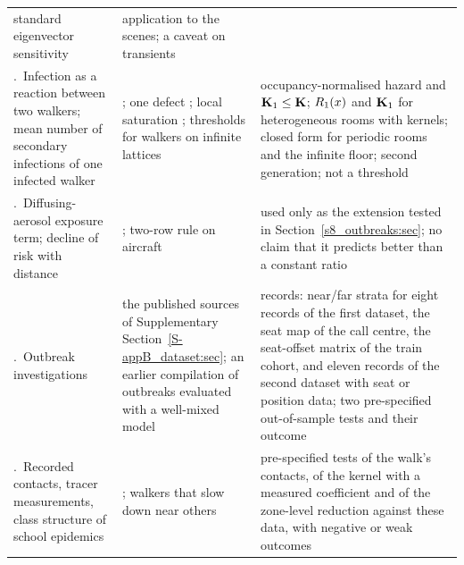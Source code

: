 \begin{table}[tbp]
\begin{tabular}{@{}>{\raggedright\arraybackslash}p{}>{\raggedright\arraybackslash}p{}>{\raggedright\arraybackslash}p{}@{}}
  standard eigenvector sensitivity &
  application to the scenes; a caveat on transients \\\addlinespace[2pt]
7.\ Infection as a reaction between two walkers; mean number of secondary infections of one infected
  walker &
  \citep{kenkre2014theory,sugaya2018analysis,giuggioli2022spatio,kenkre2021theory}; one defect
  \citep{szabo1984localized}; local saturation
  \citep{ball1997epidemics,keeling1999effects,durrett1994importance}; thresholds for walkers on
  infinite lattices \citep{kesten2006phase,maia2007diffusive,carvalho2025generalized} &
  occupancy-normalised hazard and $\mathbf{K}_1\le\mathbf{K}$; $R_1(x)$ and $\mathbf{K}_1$ for heterogeneous rooms with
  kernels; closed form for periodic rooms and the infinite floor; second generation; not a threshold
  \\\addlinespace[2pt]
8.\ Diffusing-aerosol exposure term; decline of risk with distance &
  \citep{lau2022predicting,venkatram2021modeling,cheng2011modeling}; two-row rule on aircraft
  \citep{hertzberg2016risk} &
  used only as the extension tested in Section~\ref{s8_outbreaks:sec}; no claim that it predicts better than a
  constant ratio \\\addlinespace[2pt]
9.\ Outbreak investigations &
  the published sources of Supplementary Section~\ref{S-appB_dataset:sec}; an earlier compilation of outbreaks
  evaluated with a well-mixed model \citep{peng2022practical} &
  38 records: near/far strata for eight records of the first dataset, the seat map of the call centre, the
  seat-offset matrix of the train cohort, and eleven records of the second dataset with seat or position data;
  two pre-specified out-of-sample tests and their outcome \\\addlinespace[2pt]
10.\ Recorded contacts, tracer measurements, class structure of school epidemics &
  \citep{cattuto2010dynamics,stehle2011high,genois2018can,kinahan2021aerosol,woodward2022evaluation,endo2021within};
  walkers that slow down near others \citep{starnini2013modeling} &
  pre-specified tests of the walk's contacts, of the kernel with a measured coefficient and of the zone-level
  reduction against these data, with negative or weak outcomes \\
\bottomrule
\end{tabular}
\end{table}

